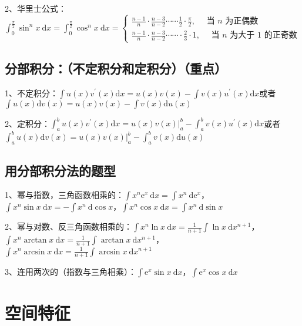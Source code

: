 2、华里士公式：$ \int_{0}^{\frac{\pi}{2}} \sin ^{n} x \mathrm{~d} x=\int_{0}^{\frac{\pi}{2}} \cos ^{n} x \mathrm{~d} x=\left\{\begin{array}{l}\frac{n-1}{n} \cdot \frac{n-3}{n-2} \cdots \cdots \frac{1}{2} \cdot \frac{\pi}{2}, \quad \text { 当 } n \text { 为正偶数 } \\\frac{n-1}{n} \cdot \frac{n-3}{n-2} \cdots \cdots \cdot \frac{2}{3} \cdot 1, \quad \text { 当 } n \text { 为大于 } 1 \text { 的正奇数 }\end{array}\right. $



\subsection{分部积分：（不定积分和定积分）（重点）}

1、不定积分：$ \int u(x) v^{\prime}(x) \mathrm{d} x=u(x) v(x)-\int v(x) u^{\prime}(x) \mathrm{d} x $或者$ \int u(x) \mathrm{d} v(x)=u(x) v(x)-\int v(x) \mathrm{d} u(x) $

2、定积分：$ \int_{a}^{b} u(x) v^{\prime}(x) \mathrm{d} x=\left.u(x) v(x)\right|_{a} ^{b}-\int_{a}^{b} v(x) u^{\prime}(x) \mathrm{d} x $或者$ \int_{a}^{b} u(x) \mathrm{d} v(x)=\left.u(x) v(x)\right|_{a} ^{b}-\int_{a}^{b} v(x) \mathrm{d} u(x) $



\subsection{用分部积分法的题型}

1、幂与指数，三角函数相乘的：$ \int x^{n} \mathrm{e}^{x} \mathrm{~d} x=\int x^{n} \mathrm{~d} \mathrm{e}^{x} $，$ \int x^{n} \sin x \mathrm{~d} x=-\int x^{n} \mathrm{~d} \cos x $，$ \int x^{n} \cos x \mathrm{~d} x=\int x^{n} \mathrm{~d} \sin x $

2、幂与对数、反三角函数相乘的：$ \int x^{n} \ln x \mathrm{~d} x=\frac{1}{n+1} \int \ln x \mathrm{~d} x^{n+1} $，$ \int x^{n} \arctan x \mathrm{~d} x=\frac{1}{n+1} \int \arctan x \mathrm{~d} x^{n+1} $，$ \int x^{n} \arcsin x \mathrm{~d} x=\frac{1}{n+1} \int \arcsin x \mathrm{~d} x^{n+1} $

3、连用两次的（指数与三角相乘）：$ \int \mathrm{e}^{x} \sin x \mathrm{~d} x $，$ \int \mathrm{e}^{x} \cos x \mathrm{~d} x $

\section{空间特征}

